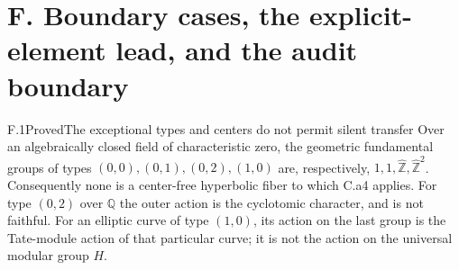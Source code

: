 \section{F. Boundary cases, the explicit-element lead, and the audit boundary}

\begin{claim}{F.1}{Proved}{The exceptional types and centers do not permit silent transfer}
Over an algebraically closed field of characteristic zero, the geometric
fundamental groups of types $(0,0),(0,1),(0,2),(1,0)$ are, respectively,
$1,1,\widehat{\mathbb Z},\widehat{\mathbb Z}^2$.
Consequently none is a center-free hyperbolic fiber to which C.a4 applies.
For type $(0,2)$ over $\mathbb Q$ the outer action is the cyclotomic
character, and is not faithful. For an elliptic curve of type $(1,0)$,
its action on the last group is the Tate-module action of that particular
curve; it is not the action on the universal modular group $H$.
\end{claim}
